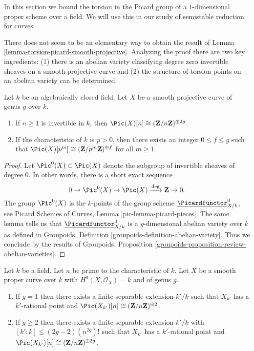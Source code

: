 \noindent
In this section we bound the torsion in the Picard group of a $1$-dimensional
proper scheme over a field. We will use this in our
study of semistable reduction for curves.

\medskip\noindent
There does not seem to be an elementary way to obtain the result of
Lemma \ref{lemma-torsion-picard-smooth-projective}.
Analyzing the proof there are two key ingredients:
(1) there is an abelian variety classifying degree zero invertible sheaves on
a smooth projective curve and (2) the structure of torsion points on
an abelian variety can be determined.

\begin{lemma}
\label{lemma-torsion-picard-smooth-projective}
Let $k$ be an algebraically closed field.
Let $X$ be a smooth projective curve of genus $g$ over $k$.
\begin{enumerate}
\item If $n \geq 1$ is invertible in $k$, then
$\Pic(X)[n] \cong (\mathbf{Z}/n\mathbf{Z})^{\oplus 2g}$.
\item If the characteristic of $k$ is $p > 0$, then there exists
an integer $0 \leq f \leq g$ such that
$\Pic(X)[p^m] \cong (\mathbf{Z}/p^m\mathbf{Z})^{\oplus f}$ for
all $m \geq 1$.
\end{enumerate}
\end{lemma}

\begin{proof}
Let $\Pic^0(X) \subset \Pic(X)$
denote the subgroup of invertible sheaves of degree $0$.
In other words, there is a short exact sequence
$$
0 \to \Pic^0(X) \to \Pic(X) \xrightarrow{\deg} \mathbf{Z} \to 0.
$$
The group $\Pic^0(X)$ is the $k$-points of
the group scheme $\underline{\Picardfunctor}^0_{X/k}$, see
Picard Schemes of Curves, Lemma \ref{pic-lemma-picard-pieces}.
The same lemma tells us that $\underline{\Picardfunctor}^0_{X/k}$
is a $g$-dimensional abelian variety over $k$ as defined in
Groupoids, Definition \ref{groupoids-definition-abelian-variety}.
Thus we conclude by the results of
Groupoids, Proposition \ref{groupoids-proposition-review-abelian-varieties}.
\end{proof}

\begin{lemma}
\label{lemma-torsion-picard-becomes-visible}
Let $k$ be a field. Let $n$ be prime to the characteristic of $k$.
Let $X$ be a smooth proper curve over $k$ with $H^0(X, \mathcal{O}_X) = k$
and of genus $g$.
\begin{enumerate}
\item If $g = 1$ then there exists a finite separable extension
$k'/k$ such that $X_{k'}$ has a $k'$-rational point and
$\Pic(X_{k'})[n] \cong (\mathbf{Z}/n\mathbf{Z})^{\oplus 2}$.
\item If $g \geq 2$ then there exists a finite separable extension
$k'/k$ with $[k' : k] \leq (2g - 2)(n^{2g})!$
such that $X_{k'}$ has a $k'$-rational point and
$\Pic(X_{k'})[n] \cong (\mathbf{Z}/n\mathbf{Z})^{\oplus 2g}$.
\end{enumerate}
\end{lemma}


